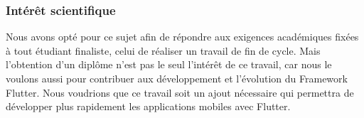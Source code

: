 \documentclass[a4paper,12pt]{report}
\begin{document}
                \subsubsection*{Intérêt scientifique}
                    Nous avons opté pour ce sujet afin de répondre aux exigences académiques fixées à tout étudiant finaliste, 
                    celui de réaliser un travail de fin de cycle. Mais l’obtention d’un diplôme n’est pas le seul l'intérêt de ce travail, 
                    car nous le voulons aussi pour contribuer aux développement et l'évolution du Framework Flutter.  
                    Nous voudrions que ce travail 
                    soit un ajout nécessaire qui permettra de développer plus rapidement les applications mobiles avec Flutter.
            
        
\end{document}
